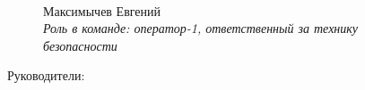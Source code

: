 \begin{figure}[H]
\begin{minipage}[h]{0.47\linewidth}
		\\
		Максимычев Евгений\\
		\emph{Роль в команде: оператор-1, ответственный за технику безопасности}
	\end{minipage}
\end{figure}

\newpage

\large Руководители:


